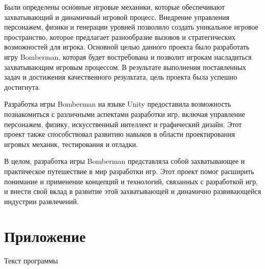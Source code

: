 \documentclass[14pt, oneside]{altsu-report}
\begin{document}
Были определены основные игровые механики, которые обеспечивают захватывающий и динамичный игровой процесс. Внедрение управления персонажем, физики и генерации уровней позволило создать уникальное игровое пространство, которое предлагает разнообразие вызовов и стратегических возможностей для игрока.
Основной целью данного проекта было разработать игру Bomberman, которая будет востребована и позволит игрокам насладиться захватывающим игровым процессом. В результате выполнения поставленных задач и достижения качественного результата, цель проекта была успешно достигнута.

Разработка игры Bomberman на языке Unity предоставила возможность познакомиться с различными аспектами разработки игр, включая управление персонажем, физику, искусственный интеллект и графический дизайн. Этот проект также способствовал развитию навыков в области проектирования игровых механик, тестирования и отладки.

В целом, разработка игры Bomberman представляла собой захватывающее и практическое путешествие в мир разработки игр. Этот проект помог расширить понимание и применение концепций и технологий, связанных с разработкой игр, и внести свой вклад в развитие этой захватывающей и динамично развивающейся индустрии развлечений.

\newpage
{}
\printbibliography[title={Список использованной литературы}]

\appendix
\newpage
\chapter*{\raggedleft\label{appendix1}Приложение}

\begin{center}
\label{code:appendix}Текст программы
\end{center}
\end{document}
